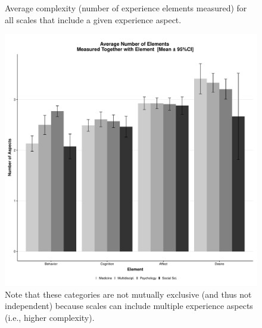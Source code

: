 \begin{figure}[h]
\centering
\caption{Average complexity (number of experience elements measured) for all scales that include a given experience aspect.}
\includegraphics[width=\textwidth]{Figures/FieldElementComp-1}
\caption*{Note that these categories are not mutually exclusive (and thus not independent) because scales can include multiple experience aspects (i.e., higher complexity).}
\label{fig:FieldElementComp}
\end{figure}
